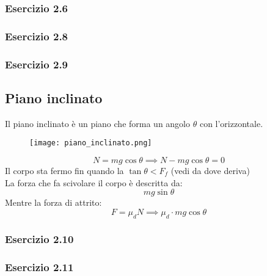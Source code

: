 \documentclass[../../main.tex]{subfiles}
\begin{document}
\subsubsection{Esercizio 2.6}

\subsubsection{Esercizio 2.8}

\subsubsection{Esercizio 2.9}

\subsection{Piano inclinato}
Il piano inclinato è un piano che forma un angolo $\theta$ con l'orizzontale.
\begin{figure}[H]
    \centering
    \texttt{[image: piano\_inclinato.png]}
\end{figure}
\[
    N = mg\cos\theta \implies N - mg\cos\theta = 0
\]
Il corpo sta fermo fin quando la $\tan\theta < F_f$ (vedi da dove deriva)\\
La forza che fa scivolare il corpo è descritta da:
\[
    mg\sin\theta
\]
Mentre la forza di attrito:
\[
    F = \mu_d N \implies \mu_d \cdot mg\cos\theta
\]

\subsubsection{Esercizio 2.10}

\subsubsection{Esercizio 2.11}
\end{document}

